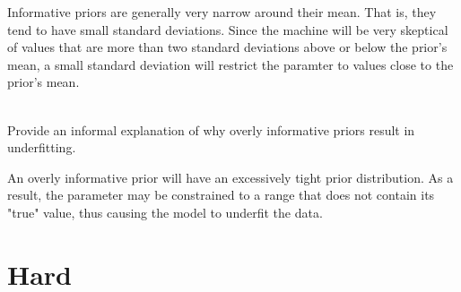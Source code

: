 \documentclass[12pt]{article}\usepackage[]{graphicx}\usepackage[]{color}
\newenvironment{problem}[2][Problem]{\begin{trivlist}
\item[\hskip \labelsep {\bfseries #1}\hskip \labelsep {\bfseries #2.}]}{\end{trivlist}}
\begin{document}
Informative priors are generally very narrow around their mean. That is, they tend to have small standard deviations. Since the machine will be very skeptical of values that are more than two standard deviations above or below the prior's mean, a small standard deviation will restrict the paramter to values close to the prior's mean.

\begin{problem}{6M6}
\text{ }\\
Provide an informal explanation of why overly informative priors result in underfitting.
\end{problem}

An overly informative prior will have an excessively tight prior distribution. As a result, the parameter may be constrained to a range that does not contain its "true" value, thus causing the model to underfit the data.

\section{Hard}
\end{document}
